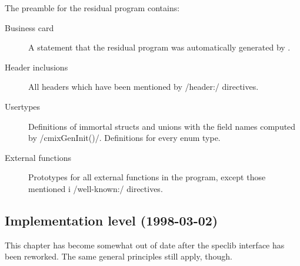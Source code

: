 \begin{docpart}
The preamble for the residual program contains:
\begin{description}
\item[Business card] A statement that the residual program was
	automatically generated by \cmix.
\item[Header inclusions] All headers which have been mentioned
	by /header:/ directives.
\item[Usertypes] Definitions of immortal structs and unions with
	the field names computed by /cmixGenInit()/. Definitions
	for every enum type.
\item[External functions] Prototypes for all external functions
	in the program, except those mentioned i /well-known:/
	directives.
\end{description}



\subsection{Implementation level (1998-03-02)}
\label{sec:GEGENImplementationLevel}

This chapter has become somewhat out of date after the speclib
interface has been reworked. The same general principles still
apply, though.

\DeleteShortVerb{/}

\end{docpart}



